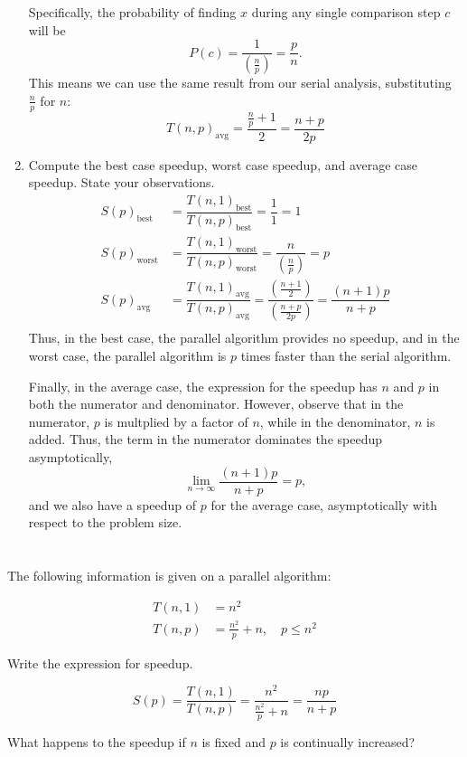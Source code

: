 \documentclass[twoside,10pt]{article}
\newcommand{\eqn}[1]{\begin{equation*}#1\end{equation*}}
\newcommand{\aln}[1]{\begin{align*}#1\end{align*}}
\begin{document}
\begin{enumerate}[label=(\alph*)]
\quad Specifically, the probability of finding $x$ during any single comparison step $c$ will be
\eqn{P(c) = \dfrac{1}{\left(\frac{n}{p}\right)} = \dfrac{p}{n}.}
\quad This means we can use the same result from our serial analysis, substituting $\frac{n}{p}$ for $n$:
\eqn{T(n,p)_\text{avg} = \dfrac{\frac{n}{p}+1}{2} = \dfrac{n + p}{2p}}

\item Compute the best case speedup, worst case speedup, and average case speedup. State your observations.
\aln{
  S(p)_{\text{best}} &= \dfrac{T(n,1)_{\text{best}}}{T(n,p)_{\text{best}}} = \dfrac{1}{1} = 1\\
  S(p)_{\text{worst}} &= \dfrac{T(n,1)_{\text{worst}}}{T(n,p)_{\text{worst}}} = \dfrac{n}{\left(\frac{n}{p}\right)} = p\\
  S(p)_{\text{avg}} &= \dfrac{T(n,1)_{\text{avg}}}{T(n,p)_{\text{avg}}} = \dfrac{\left(\frac{n+1}{2}\right)}{\left(\frac{n + p}{2p}\right)} = \dfrac{(n+1)p}{n+p}\\
}
\quad Thus, in the best case, the parallel algorithm provides no speedup, and in the worst case, the parallel algorithm is $p$ times faster than the serial algorithm.

\quad Finally, in the average case, the expression for the speedup has $n$ and $p$ in both the numerator and denominator.
However, observe that in the numerator, $p$ is multplied by a factor of $n$, while in the denominator, $n$ is added.
Thus, the term in the numerator dominates the speedup asymptotically,
\eqn{\lim_{n \to \infty}{\dfrac{(n+1)p}{n+p}} = p,}
and we also have a speedup of $p$ for the average case, asymptotically with respect to the problem size.

\end{enumerate}

\section{}

The following information is given on a parallel algorithm:

\aln{
  T(n,1) &= n^2\\
  T(n,p) &= \frac{n^2}{p} + n, \quad p \leq n^2
}

Write the expression for speedup.

\eqn{S(p)= \dfrac{T(n,1)}{T(n,p)}= \dfrac{n^2}{\frac{n^2}{p} + n} = \dfrac{np}{n + p}
}

What happens to the speedup if $n$ is fixed and $p$ is continually increased?
\end{document}
